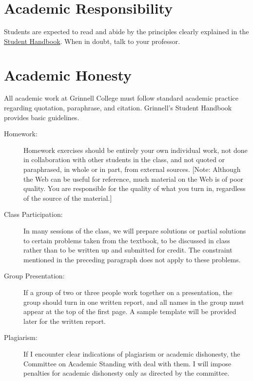 \documentclass[twoside]{article}
\begin{document}
\section{Academic Responsibility}
Students are expected to read and abide by the principles clearly explained in the \href{https://catalog.grinnell.edu/content.php?catoid=12&navoid=2537#Honesty_in_Academic_Work}{Student Handbook}. When in doubt, talk to your professor.

\section{Academic Honesty}

All academic work at Grinnell College must follow standard academic practice regarding quotation, paraphrase, and citation. Grinnell's Student Handbook provides basic guidelines. 
\begin{description}
\item [Homework:] Homework exercises should be entirely your own individual work, not done in collaboration with other students in the class, and not quoted or paraphrased, in whole or in part,  from external sources. [Note: Although the Web can be useful for reference, much material on the Web is of poor quality. You are responsible for the quality of what you turn in, regardless of the source of the material.]

\item [Class Participation:] In many sessions of the class, we will prepare solutions or partial solutions to certain problems taken from the textbook, to be discussed in class rather than to be written up and submitted for credit. The constraint mentioned in the preceding paragraph does not apply to these problems.

\item [Group Presentation:] If a group of two or three people work together on a presentation, the group should turn in one written report, and all names in the group must appear at the top of the first page. A sample template will be provided later for the written report. 

\item [Plagiarism:] If I encounter clear indications of plagiarism or academic dishonesty, the Committee on Academic Standing with deal with them. I will impose penalties for academic dishonesty only as directed by the committee.
\end{description}
\end{document}
